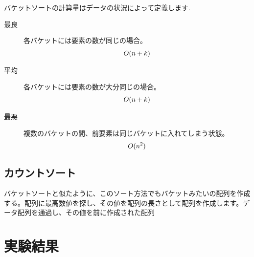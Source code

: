 \documentclass[a4j]{jarticle}
\begin{document}
バケットソートの計算量はデータの状況によって定義します.
\begin{description}
  \item[最良] 各バケットには要素の数が同じの場合。
  \begin{equation}
    \centering
    O(n+k)
  \end{equation} 
  \item[平均] 各バケットには要素の数が大分同じの場合。
  \begin{equation}
    \centering
    O(n+k)
  \end{equation}
  \item[最悪] 複数のバケットの間、前要素は同じバケットに入れてしまう状態。
  \begin{equation}
    \centering
    O(n^2)
  \end{equation}
\end{description}
\subsection{カウントソート}
バケットソートと似たように、このソート方法でもバケットみたいの配列を作成する。配列に最高数値を探し、その値を配列の長さとして配列を作成します。データ配列を通過し、その値を前に作成された配列
\section{実験結果}
\end{document}
